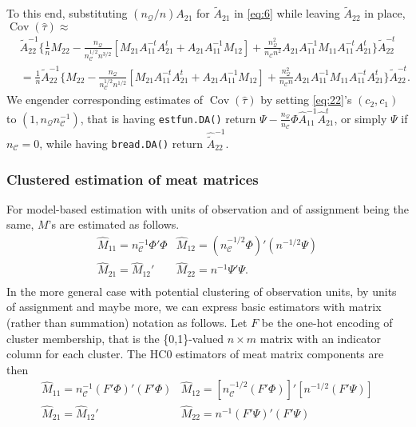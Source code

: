 \documentclass{article}
\begin{document}
To this end, substituting $(n_{\mathcal{Q}}/n)A_{21}$ for $\tilde{A}_{21}$ in \eqref{eq:6} while leaving
$\tilde{A}_{22}$ in place, $\operatorname{Cov}(\hat\tau) \approx$
  \begin{align*}
  &\tilde{A}_{22}^{-1}\{\frac{1}{n} M_{22} -
                                 \frac{n_{\mathcal{Q}}}{n_{\mathcal{C}}^{1/2}n^{3/2}}[M_{21}A_{11}^{-t}A_{21}^t
                                 + A_{21}A_{11}^{-1}M_{12}] +
                                 \frac{n_{\mathcal{Q}}^{2}}{n_{\mathcal{C}}n^{2}}A_{21}A_{11}^{-1}M_{11}A_{11}^{-t}A_{21}^{t}\}\tilde{A}_{22}^{-t}\nonumber
    \\
  &= \frac{1}{n}\tilde{A}_{22}^{-1}\{M_{22} -
                                 \frac{n_{\mathcal{Q}}}{n_{\mathcal{C}}^{1/2}n^{1/2}}[M_{21}A_{11}^{-t}A_{21}^t
                                 + A_{21}A_{11}^{-1}M_{12}] +
                                 \frac{n_{\mathcal{Q}}^{2}}{n_{\mathcal{C}}n}A_{21}A_{11}^{-1}M_{11}A_{11}^{-t}A_{21}^{t}\}\tilde{A}_{22}^{-t} .\nonumber
  \end{align*}
 We engender corresponding estimates of $\operatorname{Cov}(\hat\tau)$ by setting \eqref{eq:22}'s
 $(c_{2}, c_{1})$ to $(1, n_{\mathcal{Q}}n_{\mathcal{C}}^{-1})$, that is having
 \texttt{estfun.DA()} return $\Psi -
 \frac{n_{\mathcal{Q}}}{n_{\mathcal{C}}}\Phi
 \hat{A}_{11}^{-1}\hat{A}_{21}^{t}$, or simply $\Psi$ if $n_{\mathcal{C}}=0$, while having \texttt{bread.DA()}
 return $\hat{\tilde{A}}_{22}^{-1}$.


  \subsubsection{Clustered estimation of meat matrices}
For model-based estimation with units of observation and of assignment being
the same, $M$'s are estimated as follows. 
\begin{equation}\label{eq:7}
  \begin{array}{cc}
  \hat{M}_{11} =n_{\mathcal{C}}^{-1} \Phi'\Phi & \hat{M}_{12} = (n_{\mathcal{C}}^{-1/2}\Phi)'(n^{-1/2} \Psi)\\
    \hat{M}_{21} =\hat{M}_{12}' & \hat{M}_{22}= n^{-1}\Psi'\Psi.\\
    \end{array} 
  \end{equation}
  In the more general case with potential clustering of observation
units, by units of assignment and maybe more, we can express
basic estimators with matrix (rather than summation) notation as
follows. Let 
$F$ be the one-hot encoding of cluster membership, that is the \{0,1\}-valued $n \times m$ matrix with an indicator
column for each cluster. The HC0 estimators of meat matrix components
are then
\begin{equation} \label{eq:8}
  \begin{array}{cc}
  \hat{M}_{11} =n_{\mathcal{C}}^{-1} (F'\Phi)'(F'\Phi) & \hat{M}_{12} = [n_{\mathcal{C}}^{-1/2} (F'\Phi)]'[n^{-1/2} (F'\Psi)]\\
    \hat{M}_{21} =\hat{M}_{12}' & \hat{M}_{22}= n^{-1}(F'\Psi)'(F'\Psi)\\
    \end{array}
  \end{equation}
  
\end{document}
